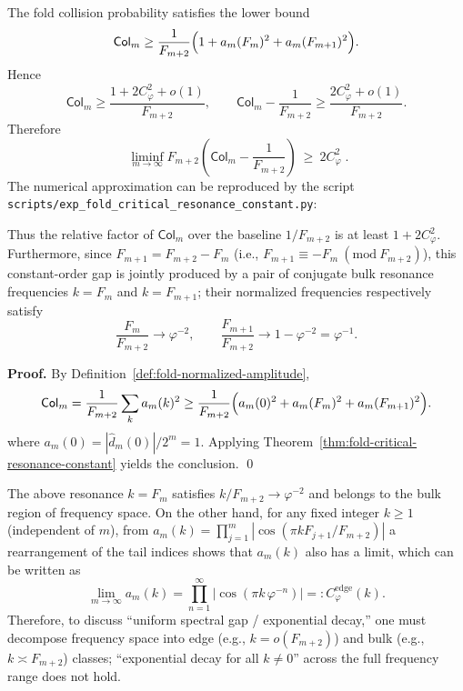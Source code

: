 \begin{corollary}\label{cor:fold-critical-resonance-gap}
The fold collision probability satisfies the lower bound
\[
\mathsf{Col}_m
\ge
\frac{1}{F_{m+2}}\Bigl(1+a_m(F_m)^2+a_m(F_{m+1})^2\Bigr).
\]
Hence
\[
\mathsf{Col}_m
\ge \frac{1+2C_\varphi^2+o(1)}{F_{m+2}},
\qquad
\mathsf{Col}_m-\frac{1}{F_{m+2}}
\ge \frac{2C_\varphi^2+o(1)}{F_{m+2}}.
\]
Therefore
\[
\boxed{\;
\liminf_{m\to\infty}F_{m+2}\!\left(\mathsf{Col}_m-\frac{1}{F_{m+2}}\right)\ \ge\ 2C_\varphi^2\; }.
\]
The numerical approximation can be reproduced by the script \texttt{scripts/exp\_fold\_critical\_resonance\_constant.py}:

Thus the relative factor of \(\mathsf{Col}_m\) over the baseline \(1/F_{m+2}\) is at least \(1+2C_\varphi^2\).
Furthermore, since \(F_{m+1}=F_{m+2}-F_m\) (i.e., \(F_{m+1}\equiv -F_m\ (\mathrm{mod}\ F_{m+2})\)), this constant-order gap is jointly produced by a pair of conjugate bulk resonance frequencies \(k=F_m\) and \(k=F_{m+1}\); their normalized frequencies respectively satisfy
\[
\frac{F_m}{F_{m+2}}\to \varphi^{-2},\qquad
\frac{F_{m+1}}{F_{m+2}}\to 1-\varphi^{-2}=\varphi^{-1}.
\]
\end{corollary}

\textbf{Proof.}
By Definition~\ref{def:fold-normalized-amplitude},
\[
\mathsf{Col}_m=\frac{1}{F_{m+2}}\sum_{k}a_m(k)^2
\ge \frac{1}{F_{m+2}}\Bigl(a_m(0)^2+a_m(F_m)^2+a_m(F_{m+1})^2\Bigr).
\]
where \(a_m(0)=|\widehat d_m(0)|/2^m=1\). Applying Theorem~\ref{thm:fold-critical-resonance-constant} yields the conclusion. \qed

\begin{remark}\label{rem:fold-edge-nondecay}
The above resonance \(k=F_m\) satisfies \(k/F_{m+2}\to \varphi^{-2}\) and belongs to the bulk region of frequency space.
On the other hand, for any fixed integer \(k\ge 1\) (independent of \(m\)), from
\(
a_m(k)=\prod_{j=1}^m|\cos(\pi kF_{j+1}/F_{m+2})|
\)
a rearrangement of the tail indices shows that \(a_m(k)\) also has a limit, which can be written as
\[
\lim_{m\to\infty}a_m(k)=\prod_{n=1}^{\infty}\bigl|\cos(\pi k\,\varphi^{-n})\bigr|=:C^{\mathrm{edge}}_\varphi(k).
\]
Therefore, to discuss ``uniform spectral gap / exponential decay,'' one must decompose frequency space into edge (e.g., \(k=o(F_{m+2})\)) and bulk (e.g., \(k\asymp F_{m+2}\)) classes; ``exponential decay for all \(k\ne 0\)'' across the full frequency range does not hold.
\end{remark}

